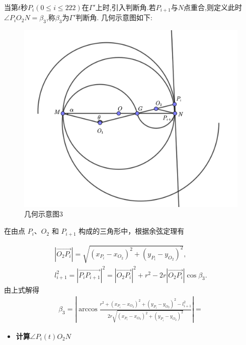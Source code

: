 \documentclass[../main.tex]{subfiles}
\begin{document}
\par 当第$t$秒$P_i(0\leq i\leq 222)$在$\varGamma'$上时,引入判断角.若$P_{i+1}$与$N$点重合,则定义此时$\angle P_iO_2N=\beta_3$,称$\beta_3$为$\varGamma'$判断角. 几何示意图如下:
\begin{figure}[H]
\centering
\includegraphics[width=.6\textwidth]{2}
\caption{几何示意图3}
\end{figure}
\par 在由点 \(P_{i}\)、\(O_{2}\) 和 \(P_{i + 1}\) 构成的三角形中，根据余弦定理有

\begin{gather}\label{1.........454}
\left| \overrightarrow{O_2P_i} \right|=\sqrt{\left( x_{P_i}-x_{O_2} \right) ^2+\left( y_{P_i}-y_{O_2} \right) ^2},
\\
l_{i+1}^{2}=\left| \overrightarrow{P_iP_{i+1}} \right|^2=\left| \overrightarrow{O_2P_i} \right|^2+r^2-2r\left| \overrightarrow{O_2P_i} \right|\cos \beta _3.
\end{gather}
由上式解得
\begin{align}\label{1.........455}
\beta _3=\left| \arccos \frac{r^2+\left( x_{P_i}-x_{O_2} \right) ^2+\left( y_{P_i}-y_{O_2} \right) ^2-l_{i+1}^{2}}{2r\sqrt{\left( x_{P_i}-x_{O_2} \right) ^2+\left( y_{P_i}-y_{O_2} \right) ^2}} \right| =
\end{align}

\begin{itemize}
\item \textbf{计算$\angle P_{i}(t)O_2N$}
\end{itemize}
\end{document}
